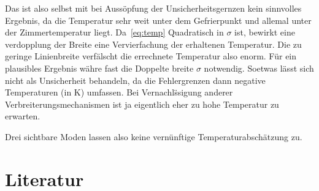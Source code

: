 \documentclass[slug=GL, room=HZDR\ Dresden/Rossendorf\,\ Geb.\ 620/123, supervisor=Tim\ Ziegler]{../../Lab_Report_LaTeX/lab_report}
\begin{document}
Das ist also selbst mit bei Auss\"opfung der Unsicherheitsgernzen kein
sinnvolles Ergebnis, da die Temperatur sehr weit unter dem
Gefrierpunkt und allemal unter der Zimmertemperatur
liegt. Da~\ref{eq:temp} Quadratisch in \(\sigma\) ist, bewirkt eine
verdopplung der Breite eine Vervierfachung der erhaltenen
Temperatur. Die zu geringe Linienbreite verf\"alscht die errechnete
Temperatur also enorm. F\"ur ein plausibles Ergebnis w\"ahre fast die
Doppelte breite \(\sigma\) notwendig. Soetwas l\"asst sich nicht als
Unsicherheit behandeln, da die Fehlergrenzen dann negative
Temperaturen (in \si{\kelvin}) umfassen. Bei Vernachl\"ssigung anderer
Verbreiterungsmechanismen ist ja eigentlich eher zu hohe Temperatur zu
erwarten.

Drei sichtbare Moden lassen also keine vern\"unftige
Temperaturabsch\"atzung zu.

\section{Literatur}
\label{sec:literatur}

\printbibliography
\end{document}
